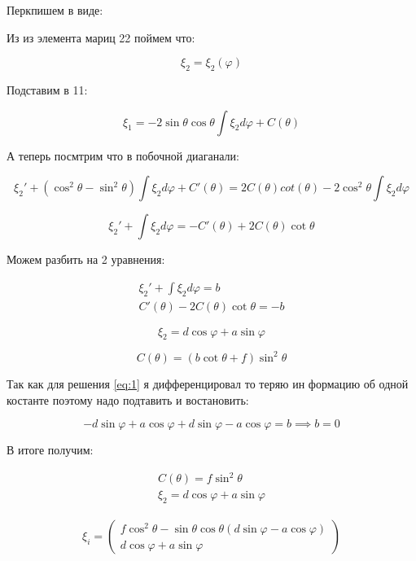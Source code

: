 \documentclass[a4paper]{article}
\newcommand{\inner}[1]{\left( #1 \right)}
\renewcommand{\phi}{\varphi}
\numberwithin{equation}{section}
\begin{document}
Перкпишем в виде:

Из из элемента мариц 22 поймем что:

\begin{equation}
    \xi_2 = \xi_2(\phi) 
\end{equation}

Подставим в 11:

\begin{equation}
    \xi_1 = -2 \sin \theta \cos \theta \int \xi_2 d\phi +C(\theta)
\end{equation}

А теперь посмтрим что в побочной диаганали:

\begin{equation}
    \xi_2' + \inner{\cos^2\theta - \sin^2\theta} \int \xi_2 d\phi + C'(\theta) = 
    2 C(\theta)cot(\theta) - 2 \cos^2 \theta \int \xi_2 d \phi
\end{equation}

\begin{equation}
    \xi_2' + \int \xi_2 d\phi = - C'(\theta) + 2 C(\theta) \cot \theta
\end{equation}

Можем разбить на 2 уравнения:

\begin{eqnarray}
    \xi_2' + \int \xi_2 d\phi = b\\
    C'(\theta) - 2 C(\theta) \cot \theta = -b
\end{eqnarray}

\begin{equation}
    \label{eq:1}
     \xi_2 = d \cos \phi  + a \sin \phi   
\end{equation}

\begin{equation}
    C(\theta) = \inner{b \cot \theta + f} \sin^2 \theta
\end{equation}

Так как для решения \ref{eq:1} я дифференцировал то теряю ин формацию 
об одной костанте поэтому надо подтавить и востановить:

\begin{equation}
    -d \sin \phi + a \cos \phi + d \sin \phi - a \cos\phi = b \implies b = 0
\end{equation}

В итоге получим:

\begin{eqnarray}
    C(\theta) = f \sin^2 \theta \\
    \xi_2 = d \cos \phi  + a \sin \phi
\end{eqnarray}

\begin{gather}
    \xi_i = 
    \begin{pmatrix}
        f \cos^2 \theta - \sin \theta \cos \theta \inner{d \sin \phi - a \cos \phi}\\
        d \cos \phi + a \sin \phi
    \end{pmatrix}
\end{gather}
\end{document}

